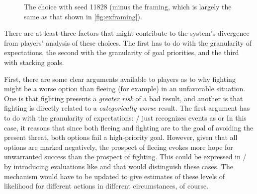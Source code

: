 \begin{figure}[!b]
\centering
{}
\caption[``Dilemma'' choice 11828]{The \dlm{} choice with seed 11828 (minus the framing, which is largely the same as that shown in \cref{fig:exframing}).}
  \label{fig:e1-seed-11828}
\end{figure}


There are at least three factors that might contribute to the system's divergence from players' analysis of these choices.
%
The first has to do with the granularity of expectations, the second with the granularity of goal priorities, and the third with stacking goals.


First, there are some clear arguments available to players as to why fighting might be a worse option than fleeing (for example) in an unfavorable situation.
%
One is that fighting presents a \emph{greater risk} of a bad result, and another is that fighting is directly related to a \emph{categorically worse} result.
%
The first argument has to do with the granularity of expectations: \dunyazad/ just recognizes events as   or 
%
In this case, it reasons that since both fleeing and fighting are  to  the goal of avoiding the present threat, both options fail a high-priority goal.
%
However, given that all options are marked negatively, the prospect of fleeing evokes more hope for unwarranted success than the prospect of fighting.
%
This could be expressed in \dunyazad/ by introducing evaluations like  and  that would distinguish these cases.
%
The  mechanism would have to be updated to give estimates of these levels of likelihood for different actions in different circumstances, of course.


